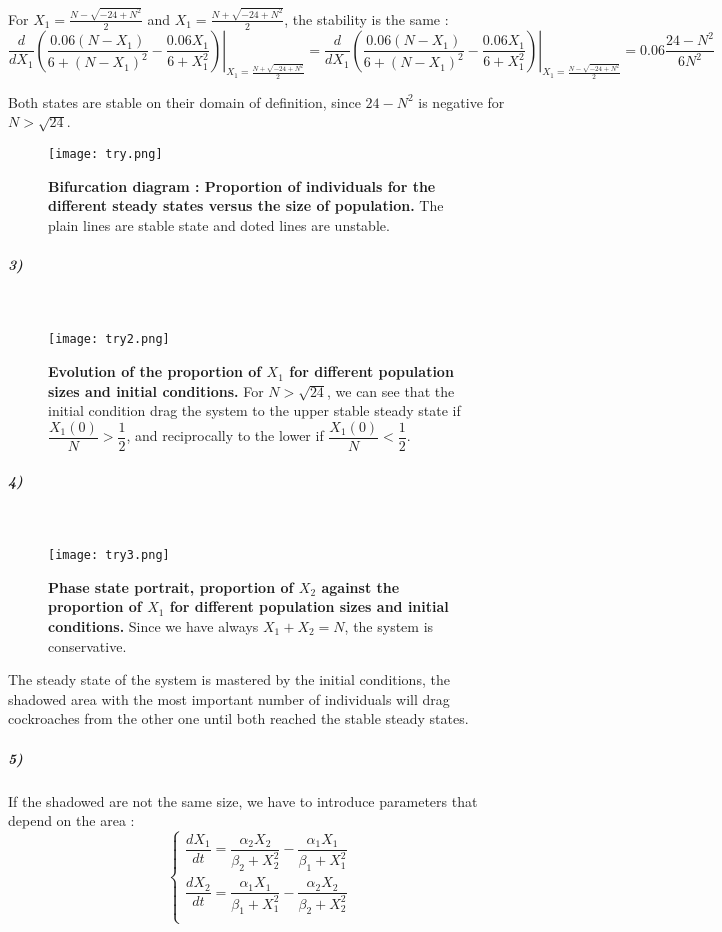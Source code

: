\documentclass{article}
\begin{document}
For $X_1=\frac{N-\sqrt{-24 +N^2}}{2}$ and $X_1=\frac{N+\sqrt{-24 +N^2}}{2}$, the stability is the same :
$$ \dfrac{d}{dX_1} \left. \left(\dfrac{0.06 (N-X_1)}{6 + (N-X_1)^2}-\dfrac{0.06 X_1}{6 + X_1^2}\right) \right|_{X_1=\frac{N+\sqrt{-24 +N^2}}{2}}=\dfrac{d}{dX_1} \left. \left(\dfrac{0.06 (N-X_1)}{6 + (N-X_1)^2}-\dfrac{0.06 X_1}{6 + X_1^2}\right) \right|_{X_1=\frac{N-\sqrt{-24 +N^2}}{2}}=0.06\dfrac{24-N^2}{6N^2}$$

Both states are stable on their domain of definition, since $24-N^2$ is negative for $N>\sqrt{24}$.

\begin{figure}[H]
	  \centering
  	\texttt{[image: try.png]}
  	\caption{\textbf{Bifurcation diagram : Proportion of individuals for the different steady states versus the size of population.} The plain lines are stable state and doted lines are unstable.}
	\end{figure}
	
\subparagraph{3)}
\

\begin{figure}[H]
	  \centering
  	\texttt{[image: try2.png]}
  	\caption{\textbf{Evolution of the proportion of $X_1$ for different population sizes and initial conditions.} For $N>\sqrt{24}$, we can see that the initial condition drag the system to the upper stable steady state if $\dfrac{X_1(0)}{N} > \dfrac{1}{2}$, and reciprocally to the lower if $\dfrac{X_1(0)}{N} < \dfrac{1}{2}$.}
	\end{figure}

\newpage
\subparagraph{4)}
\

\begin{figure}[H]
	  \centering
  	\texttt{[image: try3.png]}
  	\caption{\textbf{Phase state portrait, proportion of $X_2$ against the proportion of $X_1$ for different population sizes and initial conditions.} Since we have always $X_1+X_2=N$, the system is conservative.}
	\end{figure}

The steady state of the system is mastered by the initial conditions, the shadowed area with the most important number of individuals will drag 
cockroaches from the other one until both reached the stable steady states.
	
\subparagraph{5)}
If the shadowed are not the same size, we have to introduce parameters that depend on the area :
$$ \displaystyle \left \{
    \begin{array}{ll}
		\dfrac{d X_1}{dt}=\dfrac{\alpha_2 X_2}{\beta_2 + X_2^2}-\dfrac{\alpha_1 X_1}{\beta_1 + X_1^2} \\
		\dfrac{d X_2}{dt}=\dfrac{\alpha_1 X_1}{\beta_1 + X_1^2}-\dfrac{\alpha_2 X_2}{\beta_2 + X_2^2} \\
    \end{array}
    \right.
$$
\end{document}
